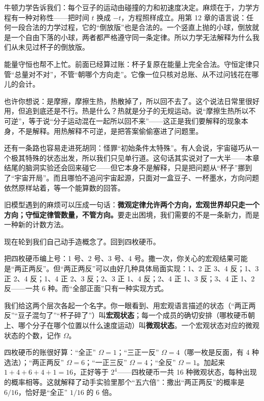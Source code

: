 牛顿力学告诉我们：每个豆子的运动由碰撞的力和初速度决定。麻烦在于，力学方程有一种对称性——把时间 \(t\) 换成 \(-t\)，方程照样成立。用第 12 章的语言说：任何一段合法的力学过程，它的“倒放版”也是合法的。一个竖直上抛的小球，倒放就是一个自由下落的小球，两者都严格遵守同一条定律。所以力学无法解释为什么我们从未见过杯子的倒放版。

能量守恒也帮不上忙。前面已经算过账：杯子复原在能量上完全合法。守恒定律只管“总量对不对”，不管“朝哪个方向走”。它像一位只核对总账、从不过问钱花在哪儿的会计。

也许你想说：是摩擦，摩擦生热，热散掉了，所以回不去了。这个说法日常里很好用，但追到底还是不行。热是什么？热就是分子的无规运动。说“摩擦生热所以不可逆”，等于说“分子运动混在一起所以回不来”——这正是我们要解释的现象本身，不是解释。用热解释不可逆，是把答案偷偷塞进了问题里。

还有一条路也容易走进死胡同：怪罪“初始条件太特殊”。有人会说，宇宙碰巧从一个极其特殊的状态出发，所以我们只见单行道。这句话其实说对了一大半——本章结尾的脑洞实验还会回来碰它——但它本身不是解释，只是把问题从“杯子”挪到了“宇宙开局”。而且哪怕不追问宇宙起源，只面对一盒豆子、一杯墨水，方向问题依然原样站着，等一个能算数的回答。

\begin{mainline}
旧模型遇到的麻烦可以压成一句话：\textbf{微观定律允许两个方向，宏观世界却只走一个方向；守恒定律管数量，不管方向。}要走出困境，我们需要的不是一条新力，而是一种新的计数方法。
\end{mainline}


现在轮到我们自己动手造概念了。回到四枚硬币。

把四枚硬币编上号：1 号、2 号、3 号、4 号。撒一次，你关心的宏观结果可能是“两正两反”。但“两正两反”可以由好几种具体局面实现：1、2 正 3、4 反；1、3 正 2、4 反；1、4 正 2、3 反；2、3 正 1、4 反；2、4 正 1、3 反；3、4 正 1、2 反——一共 6 种。而“全部正面”只有一种实现方式。

\begin{mainline}
我们给这两个层次各起一个名字。你一眼看到、用宏观语言描述的状态（“两正两反”“豆子混匀了”“杯子碎了”）叫\textbf{宏观状态}；每一个成员的确切安排（哪枚硬币朝上、哪个分子在哪个位置以什么速度运动）叫\textbf{微观状态}。一个宏观状态对应的微观状态的个数，记作 \(\Omega\)。
\end{mainline}

四枚硬币的账很好算：“全正” \(\Omega=1\)；“三正一反” \(\Omega=4\)（哪一枚是反面，有 4 种选法）；“两正两反” \(\Omega=6\)；“一正三反” \(\Omega=4\)；“全反” \(\Omega=1\)。加起来 \(1+4+6+4+1=16\)，正好等于 \(2^4\)——四枚硬币一共 16 种微观状态，每种出现的概率相等。这就解释了动手实验里那个“五六倍”：撒出“两正两反”的概率是 \(6/16\)，恰好是“全正” \(1/16\) 的 6 倍。

